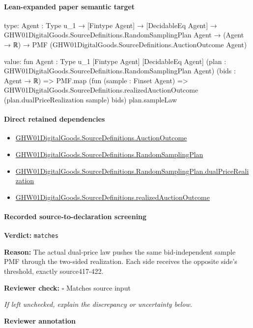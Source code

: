 \documentclass[10pt]{article}
\newcommand{\reviewerbox}{%
  \par\noindent\fbox{\parbox{0.96\linewidth}{\rule{0pt}{0.38in}}}\par
}
\newcommand{\reviewmatch}[1]{%
  \par\noindent\textbf{Reviewer check:} $\square$\; #1\par
  \noindent\emph{If left unchecked, explain the discrepancy or uncertainty below.}\par
}
\begin{document}
\paragraph{Lean-expanded paper semantic target}
\begin{ReviewVerbatim}
type:
{Agent : Type u_1} →
  [Fintype Agent] →
    [DecidableEq Agent] →
      GHW01DigitalGoods.SourceDefinitions.RandomSamplingPlan Agent →
        (Agent → ℝ) → PMF (GHW01DigitalGoods.SourceDefinitions.AuctionOutcome Agent)

value:
fun {Agent : Type u_1} [Fintype Agent] [DecidableEq Agent]
    (plan : GHW01DigitalGoods.SourceDefinitions.RandomSamplingPlan Agent) (bids : Agent → ℝ) =>
  PMF.map
    (fun (sample : Finset Agent) =>
      GHW01DigitalGoods.SourceDefinitions.realizedAuctionOutcome (plan.dualPriceRealization sample) bids)
    plan.sampleLaw
\end{ReviewVerbatim}

\paragraph{Direct retained dependencies}
\begin{itemize}\raggedright
\item \hyperlink{paper-prerequisite-fc173e8d557afd08}{GHW01\allowbreak{}Digital\allowbreak{}Goods.\allowbreak{}Source\allowbreak{}Definitions.\allowbreak{}Auction\allowbreak{}Outcome}
\item \hyperlink{governing-declaration-6a810a14ccada3a3}{GHW01\allowbreak{}Digital\allowbreak{}Goods.\allowbreak{}Source\allowbreak{}Definitions.\allowbreak{}Random\allowbreak{}Sampling\allowbreak{}Plan}
\item \hyperlink{paper-prerequisite-855c06a94b84bb1c}{GHW01\allowbreak{}Digital\allowbreak{}Goods.\allowbreak{}Source\allowbreak{}Definitions.\allowbreak{}Random\allowbreak{}Sampling\allowbreak{}Plan.\allowbreak{}dual\allowbreak{}Price\allowbreak{}Realization}
\item \hyperlink{governing-declaration-1f8637b360987e0b}{GHW01\allowbreak{}Digital\allowbreak{}Goods.\allowbreak{}Source\allowbreak{}Definitions.\allowbreak{}realized\allowbreak{}Auction\allowbreak{}Outcome}
\end{itemize}
\paragraph{Recorded source-to-declaration screening}
\textbf{Verdict:} \texttt{matches}
\\
{\raggedright
\textbf{Reason:} The actual dual-\allowbreak{}price law pushes the same bid-\allowbreak{}independent sample PMF through the two-\allowbreak{}sided realization.\allowbreak{} Each side receives the opposite side's threshold, exactly source417-\allowbreak{}422.\allowbreak{}
\par}
\reviewmatch{Matches source input}
\noindent\textbf{Reviewer annotation}\par
\reviewerbox
\clearpage
\hypertarget{paper-prerequisite-093498a5a1839250}{}
\end{document}
